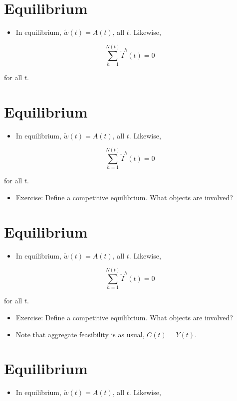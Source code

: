 \documentclass[10pt]{article}
\begin{document}
\section*{Equilibrium}
\begin{itemize}
  \item In equilibrium, $\tilde{w}(t)=A(t)$, all $t$. Likewise,
\end{itemize}

$$
\sum_{h=1}^{N(t)} \tilde{I}^{h}(t)=0
$$

for all $t$.

\section*{Equilibrium}
\begin{itemize}
  \item In equilibrium, $\tilde{w}(t)=A(t)$, all $t$. Likewise,
\end{itemize}

$$
\sum_{h=1}^{N(t)} \tilde{I}^{h}(t)=0
$$

for all $t$.

\begin{itemize}
  \item Exercise: Define a competitive equilibrium. What objects are involved?
\end{itemize}

\section*{Equilibrium}
\begin{itemize}
  \item In equilibrium, $\tilde{w}(t)=A(t)$, all $t$. Likewise,
\end{itemize}

$$
\sum_{h=1}^{N(t)} \tilde{I}^{h}(t)=0
$$

for all $t$.

\begin{itemize}
  \item Exercise: Define a competitive equilibrium. What objects are involved?
  \item Note that aggregate feasibility is as usual, $C(t)=Y(t)$.
\end{itemize}

\section*{Equilibrium}
\begin{itemize}
  \item In equilibrium, $\tilde{w}(t)=A(t)$, all $t$. Likewise,
\end{itemize}
\end{document}
